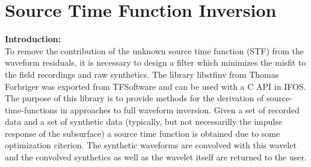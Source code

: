 \chapter{\label{cha:STF-Inversion}Source Time Function Inversion}
\textbf{Introduction:}\\
To remove the contribution of the unknown source time function (STF) from the waveform residuals, it is necessary to design a filter which minimizes the misfit to the field recordings and raw synthetics. The library libstfinv from Thomas Forbriger was exported from TFSoftware and can be used with a C API in IFOS. The purpose of this library is to provide methods for the derivation of source-time-functions in approaches to full waveform inversion. Given a set of recorded data and a set of synthetic data (typically, but not necessarilly the impulse response of the subsurface) a source time function is obtained due to some optimization citerion. The synthetic waveforms are convolved with this wavelet and the convolved synthetics as well as the wavelet itself are returned to the user.

